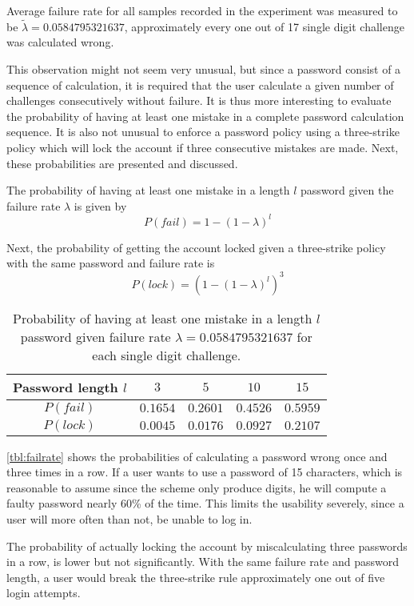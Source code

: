 \begin{observation}\label{obs:failrate}
    Average failure rate for all samples recorded in the experiment was measured to be $\tilde \lambda = 0.0584795321637$, approximately every one out of 17 single digit challenge was calculated wrong.
\end{observation}
This observation might not seem very unusual, but since a password consist of a sequence of calculation, it is required that the user calculate a given number of challenges consecutively without failure. It is thus more interesting to evaluate the probability of having at least one mistake in a complete password calculation sequence. It is also not unusual to enforce a password policy using a three-strike policy which will lock the account if three consecutive mistakes are made. Next, these probabilities are presented and discussed. 


The probability of having at least one mistake in a length $l$ password given the failure rate $\lambda$ is given by
\begin{equation}\label{eq:failrate}
    P(fail) = 1 - (1 - \lambda)^l
\end{equation}

Next, the probability of getting the account locked given a three-strike policy with the same password and failure rate is 
\begin{equation}\label{eq:lockrate}
    P(lock) = ( 1 - (1 - \lambda)^l )^3
\end{equation}


\begin{table}[h]
    \centering
\begin{tabular}{|c|c|c|c|c|}
    \hline
    Password length $l$ & $3$ & $5$ & $10$ & $15$ \\ \hline \hline
    $P(fail)$ & $0.1654$ & $0.2601$ & $0.4526$ & $0.5959$ \\ \hline
    $P(lock)$ & $0.0045$ & $0.0176$ & $0.0927$ & $0.2107$ \\ \hline
\end{tabular}
\caption{Probability of having at least one mistake in a length $l$ password given failure rate $\lambda = 0.0584795321637$ for each single digit challenge.}
\label{tbl:failrate}
\end{table}
 
\par \autoref{tbl:failrate} shows the probabilities of calculating a password wrong once and three times in a row. If a user wants to use a password of 15 characters, which is reasonable to assume since the scheme only produce digits, he will compute a faulty password nearly 60\% of the time. This limits the usability severely, since a user will more often than not, be unable to log in.
\par The probability of actually locking the account by miscalculating three passwords in a row, is lower but not significantly. With the same failure rate and password length, a user would break the three-strike rule approximately one out of five login attempts.

